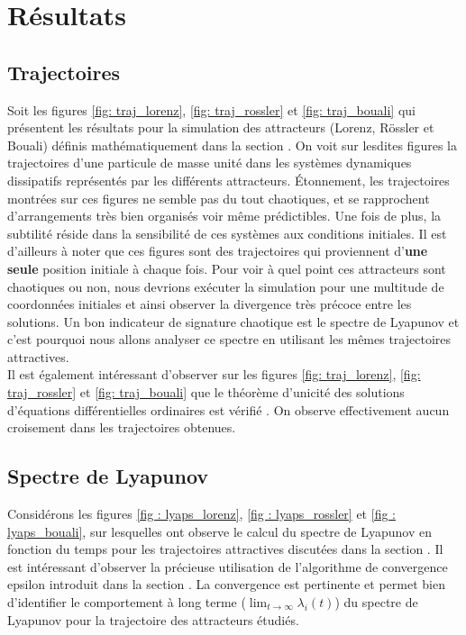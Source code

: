 \section{Résultats} \label{sec: resultats}

\subsection{Trajectoires} \label{subsec: res_trajectories}
    Soit les figures \ref{fig: traj_lorenz}, \ref{fig: traj_rossler} et \ref{fig: traj_bouali} qui présentent les résultats pour la simulation des attracteurs (Lorenz, Rössler et Bouali) définis mathématiquement dans la section . On voit sur lesdites figures la trajectoires d'une particule de masse unité dans les systèmes dynamiques dissipatifs représentés par les différents attracteurs. Étonnement, les trajectoires montrées sur ces figures ne semble pas du tout chaotiques, et se rapprochent d'arrangements très bien organisés voir même prédictibles. Une fois de plus, la subtilité réside dans la sensibilité de ces systèmes aux conditions initiales. Il est d'ailleurs à noter que ces figures sont des trajectoires qui proviennent d'\textbf{une seule} position initiale à chaque fois. Pour voir à quel point ces attracteurs sont chaotiques ou non, nous devrions exécuter la simulation pour une multitude de coordonnées initiales et ainsi observer la divergence très précoce entre les solutions. Un bon indicateur de signature chaotique est le spectre de Lyapunov et c'est pourquoi nous allons analyser ce spectre en utilisant les mêmes trajectoires attractives. \\

    Il est également intéressant d'observer sur les figures \ref{fig: traj_lorenz}, \ref{fig: traj_rossler} et \ref{fig: traj_bouali} que le théorème d'unicité des solutions d'équations différentielles ordinaires est vérifié \cite{uniqueness}. On observe effectivement aucun croisement dans les trajectoires obtenues.

\subsection{Spectre de Lyapunov} \label{subsec: res_lyapunov}
    Considérons les figures \ref{fig : lyaps_lorenz}, \ref{fig : lyaps_rossler} et \ref{fig : lyaps_bouali}, sur lesquelles ont observe le calcul du spectre de Lyapunov en fonction du temps pour les trajectoires attractives discutées dans la section . Il est intéressant d'observer la précieuse utilisation de l'algorithme de convergence epsilon introduit dans la section . La convergence est pertinente et permet bien d'identifier le comportement à long terme ($\lim_{t\to\infty}\lambda_i(t)$) du spectre de Lyapunov pour la trajectoire des attracteurs étudiés. \\

